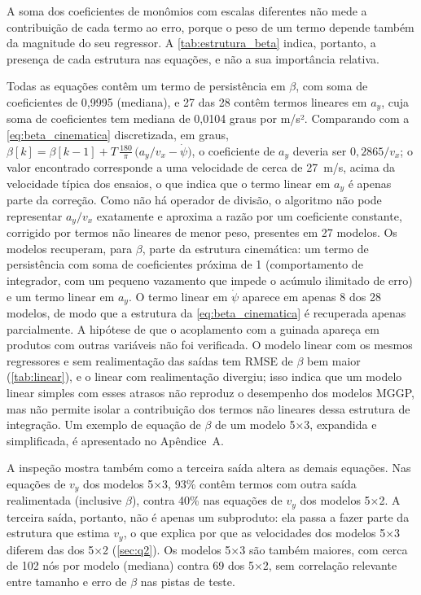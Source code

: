 

A soma dos coeficientes de monômios com escalas diferentes não mede a contribuição de cada termo ao erro, porque o peso de um termo depende também da magnitude do seu regressor. A \autoref{tab:estrutura_beta} indica, portanto, a presença de cada estrutura nas equações, e não a sua importância relativa.

Todas as equações contêm um termo de persistência em $\beta$, com soma de coeficientes de 0,9995 (mediana), e 27 das 28 contêm termos lineares em $a_y$, cuja soma de coeficientes tem mediana de 0,0104 graus por m/s². Comparando com a \autoref{eq:beta_cinematica} discretizada, em graus, $\beta[k] = \beta[k-1] + T\,\frac{180}{\pi}\,\big(a_y/v_x - \dot\psi\big)$, o coeficiente de $a_y$ deveria ser $0{,}2865/v_x$; o valor encontrado corresponde a uma velocidade de cerca de 27~m/s, acima da velocidade típica dos ensaios, o que indica que o termo linear em $a_y$ é apenas parte da correção. Como não há operador de divisão, o algoritmo não pode representar $a_y/v_x$ exatamente e aproxima a razão por um coeficiente constante, corrigido por termos não lineares de menor peso, presentes em 27 modelos. Os modelos recuperam, para $\beta$, parte da estrutura cinemática: um termo de persistência com soma de coeficientes próxima de 1 (comportamento de integrador, com um pequeno vazamento que impede o acúmulo ilimitado de erro) e um termo linear em $a_y$. O termo linear em $\dot\psi$ aparece em apenas 8 dos 28 modelos, de modo que a estrutura da \autoref{eq:beta_cinematica} é recuperada apenas parcialmente. A hipótese de que o acoplamento com a guinada apareça em produtos com outras variáveis não foi verificada. O modelo linear com os mesmos regressores e sem realimentação das saídas tem RMSE de $\beta$ bem maior (\autoref{tab:linear}), e o linear com realimentação divergiu; isso indica que um modelo linear simples com esses atrasos não reproduz o desempenho dos modelos MGGP, mas não permite isolar a contribuição dos termos não lineares dessa estrutura de integração. Um exemplo de equação de $\beta$ de um modelo 5×3, expandida e simplificada, é apresentado no Apêndice~A.

A inspeção mostra também como a terceira saída altera as demais equações. Nas equações de $v_y$ dos modelos 5×3, 93\% contêm termos com outra saída realimentada (inclusive $\beta$), contra 40\% nas equações de $v_y$ dos modelos 5×2. A terceira saída, portanto, não é apenas um subproduto: ela passa a fazer parte da estrutura que estima $v_y$, o que explica por que as velocidades dos modelos 5×3 diferem das dos 5×2 (\autoref{sec:q2}). Os modelos 5×3 são também maiores, com cerca de 102 nós por modelo (mediana) contra 69 dos 5×2, sem correlação relevante entre tamanho e erro de $\beta$ nas pistas de teste.

